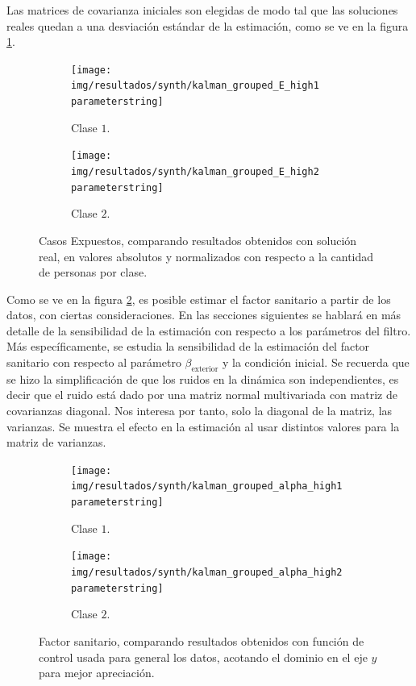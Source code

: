 Las matrices de covarianza iniciales son elegidas de modo tal que las soluciones reales quedan a una desviación estándar de la estimación, como se ve en la figura \ref{synth-e-comp-high}.


\begin{figure}[!h]
     \centering
     \begin{subfigure}[b]{\textwidth}
         \centering
         \texttt{[image: img/resultados/synth/kalman\_grouped\_E\_high1\\parameterstring]}
         \caption{Clase \(1\).}
     \end{subfigure}
     \hfill
     \begin{subfigure}[b]{\textwidth}
         \centering
         \texttt{[image: img/resultados/synth/kalman\_grouped\_E\_high2\\parameterstring]}
         \caption{Clase \(2\).}
     \end{subfigure}
        \caption{Casos Expuestos, comparando resultados obtenidos con solución real, en valores absolutos y normalizados con respecto a la cantidad de personas por clase.}
        \label{synth-e-comp-high}
\end{figure}


Como se ve en la figura \ref{synth-alpha-comp-high}, es posible estimar el factor sanitario a partir de los datos, con ciertas consideraciones. En las secciones siguientes  se hablará en más detalle de la sensibilidad de la estimación con respecto a los parámetros del filtro. Más específicamente, se estudia la sensibilidad de la estimación del factor sanitario con respecto al parámetro \(\beta_{\text{exterior}}\) y la condición inicial. Se recuerda que se hizo la simplificación de que los ruidos en la dinámica son independientes, es decir que el ruido está dado por una matriz normal multivariada con matriz de covarianzas diagonal. Nos interesa por tanto, solo la diagonal de la matriz, las varianzas. Se muestra el efecto en la estimación al usar distintos valores para la matriz de varianzas.

\begin{figure}[!h]
     \centering
     \begin{subfigure}[b]{\textwidth}
         \centering
         \texttt{[image: img/resultados/synth/kalman\_grouped\_alpha\_high1\\parameterstring]}
         \caption{Clase \(1\).}
     \end{subfigure}
     \hfill
     \begin{subfigure}[b]{\textwidth}
         \centering
         \texttt{[image: img/resultados/synth/kalman\_grouped\_alpha\_high2\\parameterstring]}
         \caption{Clase \(2\).}
     \end{subfigure}
        \caption[Factor sanitario, caso sintético]{Factor sanitario, comparando resultados obtenidos con función de control usada para general los datos, acotando el dominio en el eje \(y\) para mejor apreciación.}
        \label{synth-alpha-comp-high}
\end{figure}


